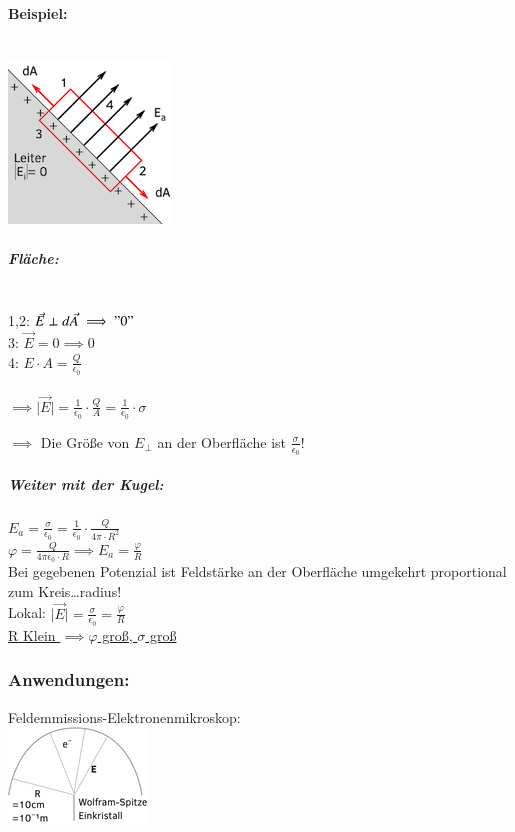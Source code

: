 \documentclass[11pt]{article}
\begin{document}
\paragraph{Beispiel:}
\hfill\\
\includegraphics{skizzen/14/14_8B1}
\\
\subparagraph{Fläche:}
\hfill\\
1,2: $ \vec{E}\perp d\vec{A} \implies "0" $\\
3: $ \vec{E}=0 \implies 0 $\\
4: $ E\cdot A= \frac{Q}{\epsilon_0} $\\
\hfill\\

$ \implies \vert\vec{E}\vert = \frac{1}{\epsilon_0}\cdot \frac{Q}{A} = \frac{1}{\epsilon_0}\cdot\sigma $

$\implies$ Die Grö\ss{}e von $E_\perp$ an der Oberfläche ist $\frac{\sigma}{\epsilon_0}$!\\

\subparagraph{Weiter mit der Kugel:} $ E_a= \frac{\sigma}{\epsilon_0}=\frac{1}{\epsilon_0}\cdot\frac{Q}{4\pi\cdot R^2} $\\

$ \varphi = \frac{Q}{4\pi\epsilon_0\cdot R} \implies E_a=\frac{\varphi}{R}$\\

Bei gegebenen Potenzial ist Feldstärke an der Oberfläche umgekehrt proportional zum Kreis…radius!\\

Lokal: $ \vert\vec{E}\vert = \frac{\sigma}{\epsilon_0}=\frac{\varphi}{R} $\\

\underline{R Klein $\implies \varphi$ gro\ss{}, $\sigma$ gro\ss{}}\\

\subsubsection{Anwendungen:} Feldemmissions-Elektronenmikroskop:
\hfill\\
\includegraphics{skizzen/14/14_8B2}\\
\end{document}

